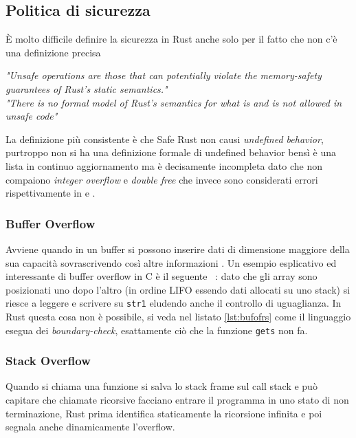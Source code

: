 \documentclass{article}
\begin{document}
\subsection{Politica di sicurezza}
È molto difficile definire la sicurezza in Rust anche solo per il fatto che non c'è una definizione precisa
\begin{center}
	\textit{"Unsafe operations are those that can potentially violate the memory-safety guarantees of Rust's static semantics."}\cite[14]{rust:reference} \\
	\textit{"There is no formal model of Rust's semantics for what is and is not allowed in unsafe code"}\cite[14.3]{rust:reference}
\end{center}
La definizione più consistente è che Safe Rust non causi \emph{undefined behavior}, purtroppo non si ha una definizione formale di undefined behavior bensì è una lista in continuo aggiornamento \cite[14.3]{rust:reference} ma è decisamente incompleta dato che non compaiono \emph{integer overflow} e \emph{double free} che invece sono considerati errori rispettivamente in \cite[3.2]{rust:language} e \cite[4.1]{rust:language}.

\subsubsection{Buffer Overflow}
Avviene quando in un buffer si possono inserire dati di dimensione maggiore della sua capacità sovrascrivendo così altre informazioni \cite{nist:800}. 
Un esempio esplicativo ed interessante di buffer overflow in C è il seguente ~\cite[7.5]{stallings:os}: dato che gli array sono posizionati uno dopo l'altro (in ordine LIFO essendo dati allocati su uno stack) si riesce a leggere e scrivere su \texttt{str1} eludendo anche il controllo di uguaglianza. In Rust questa cosa non è possibile, si veda nel listato \ref{lst:bufofrs} come il linguaggio esegua dei \emph{boundary-check}, esattamente ciò che la funzione \texttt{gets} non fa.







\subsubsection{Stack Overflow}
Quando si chiama una funzione si salva lo stack frame sul call stack e può capitare che chiamate ricorsive facciano entrare il programma in uno stato di non terminazione, Rust prima identifica staticamente la ricorsione infinita e poi segnala anche dinamicamente l'overflow.
\end{document}

